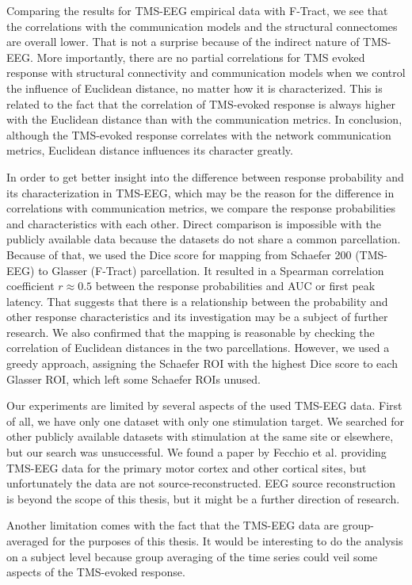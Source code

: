 Comparing the results for TMS-EEG empirical data with F-Tract, we see that the correlations with the communication models and the structural connectomes are overall lower. That is not a surprise because of the indirect nature of TMS-EEG. More importantly, there are no partial correlations for TMS evoked response with structural connectivity and communication models when we control the influence of Euclidean distance, no matter how it is characterized. This is related to the fact that the correlation of TMS-evoked response is always higher with the Euclidean distance than with the communication metrics. In conclusion, although the TMS-evoked response correlates with the network communication metrics, Euclidean distance influences its character greatly.

In order to get better insight into the difference between response probability and its characterization in TMS-EEG, which may be the reason for the difference in correlations with communication metrics, we compare the response probabilities and characteristics with each other. Direct comparison is impossible with the publicly available data because the datasets do not share a common parcellation. Because of that, we used the Dice score for mapping from Schaefer 200 (TMS-EEG) to Glasser (F-Tract) parcellation. It resulted in a Spearman correlation coefficient $r\approx0.5$ between the response probabilities and AUC or first peak latency. That suggests that there is a relationship between the probability and other response characteristics and its investigation may be a subject of further research. We also confirmed that the mapping is reasonable by checking the correlation of Euclidean distances in the two parcellations. However, we used a greedy approach, assigning the Schaefer ROI with the highest Dice score to each Glasser ROI, which left some Schaefer ROIs unused. 

Our experiments are limited by several aspects of the used TMS-EEG data. First of all, we have only one dataset with only one stimulation target. We searched for other publicly available datasets with stimulation at the same site or elsewhere, but our search was unsuccessful. We found a paper by Fecchio et al. \cite{fecchio_spectral_2017} providing TMS-EEG data for the primary motor cortex and other cortical sites, but unfortunately the data are not source-reconstructed. EEG source reconstruction is beyond the scope of this thesis, but it might be a further direction of research.

Another limitation comes with the fact that the TMS-EEG data are group-averaged for the purposes of this thesis. It would be interesting to do the analysis on a subject level because group averaging of the time series could veil some aspects of the TMS-evoked response.

